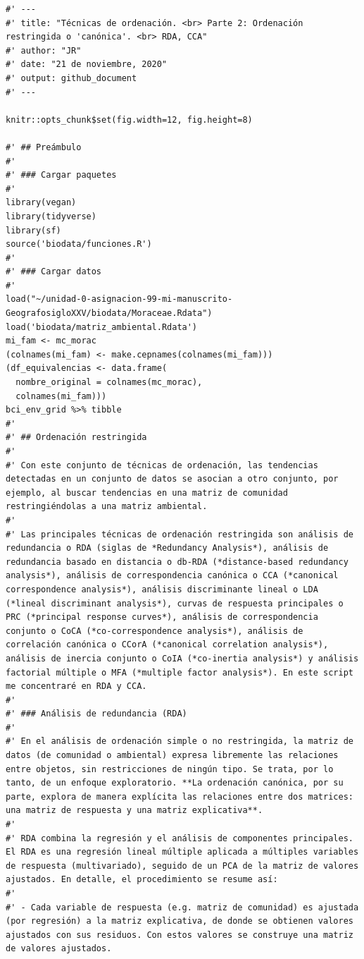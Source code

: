 \documentclass[11pt,]{article}
\begin{document}
\begin{verbatim}
#' ---
#' title: "Técnicas de ordenación. <br> Parte 2: Ordenación restringida o 'canónica'. <br> RDA, CCA"
#' author: "JR"
#' date: "21 de noviembre, 2020"
#' output: github_document
#' ---

knitr::opts_chunk$set(fig.width=12, fig.height=8)

#' ## Preámbulo
#' 
#' ### Cargar paquetes
#' 
library(vegan)
library(tidyverse)
library(sf)
source('biodata/funciones.R')
#' 
#' ### Cargar datos
#' 
load("~/unidad-0-asignacion-99-mi-manuscrito-GeografosigloXXV/biodata/Moraceae.Rdata")
load('biodata/matriz_ambiental.Rdata')
mi_fam <- mc_morac
(colnames(mi_fam) <- make.cepnames(colnames(mi_fam)))
(df_equivalencias <- data.frame(
  nombre_original = colnames(mc_morac),
  colnames(mi_fam)))
bci_env_grid %>% tibble
#' 
#' ## Ordenación restringida
#' 
#' Con este conjunto de técnicas de ordenación, las tendencias detectadas en un conjunto de datos se asocian a otro conjunto, por ejemplo, al buscar tendencias en una matriz de comunidad  restringiéndolas a una matriz ambiental.
#' 
#' Las principales técnicas de ordenación restringida son análisis de redundancia o RDA (siglas de *Redundancy Analysis*), análisis de redundancia basado en distancia o db-RDA (*distance-based redundancy analysis*), análisis de correspondencia canónica o CCA (*canonical correspondence analysis*), análisis discriminante lineal o LDA (*lineal discriminant analysis*), curvas de respuesta principales o PRC (*principal response curves*), análisis de correspondencia conjunto o CoCA (*co-correspondence analysis*), análisis de correlación canónica o CCorA (*canonical correlation analysis*), análisis de inercia conjunto o CoIA (*co-inertia analysis*) y análisis factorial múltiple o MFA (*multiple factor analysis*). En este script me concentraré en RDA y CCA.
#' 
#' ### Análisis de redundancia (RDA)
#' 
#' En el análisis de ordenación simple o no restringida, la matriz de datos (de comunidad o ambiental) expresa libremente las relaciones entre objetos, sin restricciones de ningún tipo. Se trata, por lo tanto, de un enfoque exploratorio. **La ordenación canónica, por su parte, explora de manera explícita las relaciones entre dos matrices: una matriz de respuesta y una matriz explicativa**.
#' 
#' RDA combina la regresión y el análisis de componentes principales. El RDA es una regresión lineal múltiple aplicada a múltiples variables de respuesta (multivariado), seguido de un PCA de la matriz de valores ajustados. En detalle, el procedimiento se resume así:
#' 
#' - Cada variable de respuesta (e.g. matriz de comunidad) es ajustada (por regresión) a la matriz explicativa, de donde se obtienen valores ajustados con sus residuos. Con estos valores se construye una matriz de valores ajustados.

\end{verbatim}
\end{document}
